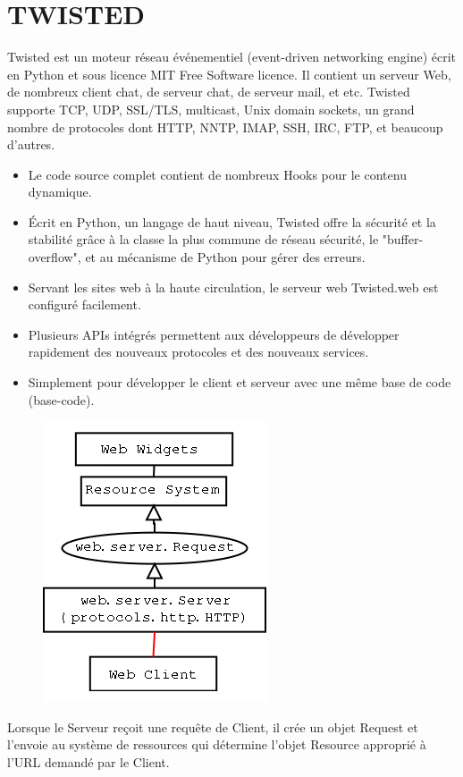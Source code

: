 \documentclass[a4paper,10pt]{report}
\begin{document}
  \section{TWISTED}
Twisted est un moteur réseau événementiel (event-driven networking engine) écrit en Python et sous licence MIT Free Software licence. Il contient un serveur Web, de nombreux client chat, de serveur chat, de serveur mail, et etc. Twisted supporte TCP, UDP, SSL/TLS, multicast, Unix domain sockets, un grand nombre de protocoles dont HTTP, NNTP, IMAP, SSH, IRC, FTP, et beaucoup d'autres.
\begin{itemize}
\item Le code source complet contient de nombreux Hooks pour le contenu dynamique.
\item Écrit en Python, un langage de haut niveau, Twisted offre la sécurité et la stabilité grâce à la classe la plus commune de réseau sécurité, le "buffer-overflow", et au mécanisme de Python pour gérer des erreurs. 
\item Servant les sites web à la haute circulation, le serveur web Twisted.web est configuré facilement.
\item Plusieurs APIs intégrés permettent aux développeurs de développer rapidement des nouveaux protocoles et des nouveaux services.
\item Simplement pour développer le client et serveur avec une même base de code (base-code).
\end{itemize}


\begin{figure}[!ht]
  \centering
  \includegraphics[scale=0.7, bb=0 0 251 314]{img/Twisted.png}     
\end{figure} 

Lorsque le Serveur reçoit une requête de Client, il crée un objet Request et l’envoie au système de ressources qui détermine l’objet Resource approprié à l’URL demandé par le Client.
\end{document}
